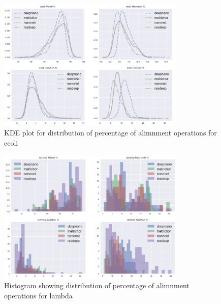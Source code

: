 \documentclass[times, utf8, diplomski, numeric, english]{fer}
\begin{document}
\begin{figure}[!htb]
	\begin{center}
		\includegraphics[width=0.8\textwidth]{./imgs/results/ecoli/kde_cigar_lines.png}
		\caption{KDE plot for distribution of percentage of alimnment operations for ecoli}
		\label{fg:ecoli_kde}
	\end{center}
\end{figure}

\begin{figure}[!htb]
	\begin{center}
		\includegraphics[width=0.8\textwidth]{./imgs/results/lambda/hist_20.png}
		\caption{Histogram showing distribution of percentage of alimnment operations for lambda}
		\label{fg:hist}
	\end{center}
\end{figure}
\end{document}
